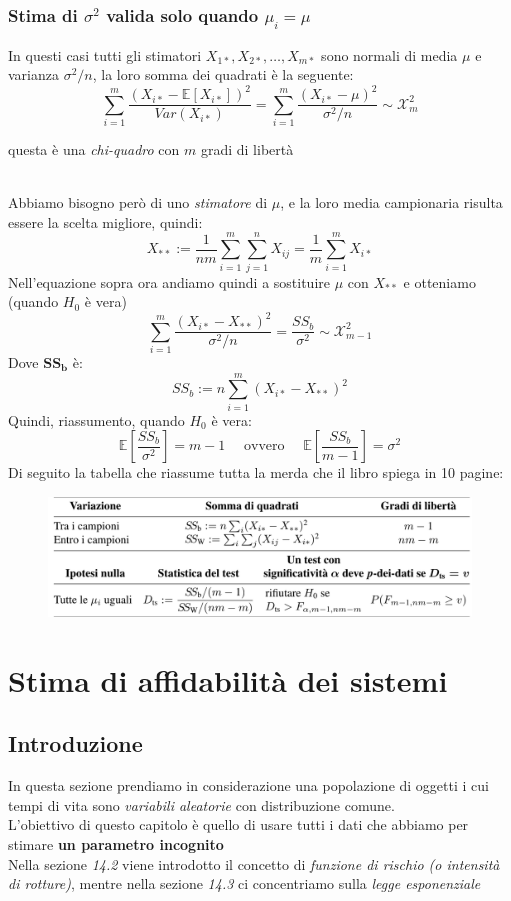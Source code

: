 \documentclass[]{article}
\newcommand{\ev}{\mathbb{E}[X]}
\renewcommand{\ev}[1]{\mathbb{E}\left[#1\right]}
\begin{document}
    \subsubsection{Stima di $\sigma^2$ valida solo quando $\mu_i = \mu$}
    In questi casi tutti gli stimatori $X_{1*}, X_{2*}, \ldots, X_{m*}$ sono normali di media $\mu$ e varianza $\sigma^2/n$, la loro somma dei quadrati è la seguente:
    \[ \sum_{i=1}^{m} \frac{(X_{i*} - \ev{X_{i*}})^2}{Var(X_{i*})} = \sum_{i=1}^{m} \frac{(X_{i*} - \mu)^2}{\sigma^2 / n} \sim \mathcal{X}^2_m \]
    \centerline{questa è una \textit{chi-quadro} con $m$ gradi di libertà} \\[2ex]
    Abbiamo bisogno però di uno \textit{stimatore} di $\mu$, e la loro media campionaria risulta essere la scelta migliore, quindi:
    \[ X_{**} := \frac{1}{nm} \sum_{i=1}^{m} \sum_{j=1}^{n} X_{ij} = \frac{1}{m} \sum_{i=1}^{m} X_{i*} \]
    Nell'equazione sopra ora andiamo quindi a sostituire $\mu$ con $X_{**}$ e otteniamo (quando $H_0$ è vera) 
    \[ \sum_{i=1}^{m} \frac{(X_{i*} - X_{**})^2}{\sigma^2 / n} = \frac{SS_b}{\sigma^2} \sim \mathcal{X}^2_{m-1} \]
    Dove $\boldsymbol{SS_b}$ è:
    \[ SS_b := n \sum_{i=1}^{m} (X_{i*} - X_{**})^2 \]
    Quindi, riassumento, quando $H_0$ è vera:
    \[ \ev{\frac{SS_b}{\sigma^2}} = m -1 \quad \text{ ovvero } \quad \ev{\frac{SS_b}{m-1}} = \sigma^2 \]
    Di seguito la tabella che riassume tutta la merda che il libro spiega in 10 pagine:
    \begin{figure}[H]
        \includegraphics[width=\textwidth]{images/boh_11.png}
    \end{figure}
    \newpage
    \section{Stima di affidabilità dei sistemi}
    \subsection{Introduzione}
    In questa sezione prendiamo in considerazione una popolazione di oggetti i cui tempi di vita sono \textit{variabili aleatorie} con distribuzione comune. \\
    L'obiettivo di questo capitolo è quello di usare tutti i dati che abbiamo per stimare \textbf{un parametro incognito} \\
    Nella sezione \textit{14.2} viene introdotto il concetto di \textit{funzione di rischio (o intensità di rotture)}, mentre nella sezione \textit{14.3} ci concentriamo sulla \textit{legge esponenziale}
\end{document}
